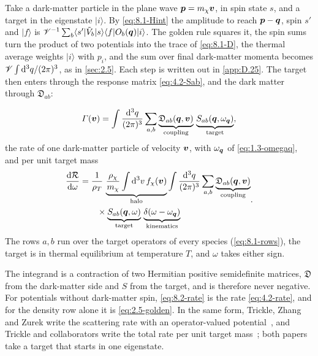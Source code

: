 Take a dark-matter particle in the plane wave $\bm{p} = m_{\chi}\bm{v}$, in spin state $s$, and a target in the eigenstate $|i\rangle$. By \cref{eq:8.1-Hint} the amplitude to reach $\bm{p} - \bm{q}$, spin $s'$ and $|f\rangle$ is $\mathscr{V}^{-1}\sum_b\langle s'|\tilde V_b|s\rangle\langle f|O_b(\bm{q})|i\rangle$. The golden rule squares it, the spin sums turn the product of two potentials into the trace of \cref{eq:8.1-D}, the thermal average weights $|i\rangle$ with $p_i$, and the sum over final dark-matter momenta becomes $\mathscr{V}\int\mathrm{d}^3q/(2\pi)^3$, as in \cref{sec:2.5}. Each step is written out in \cref{app:D.25}. The target then enters through the response matrix \cref{eq:4.2-Sab}, and the dark matter through $\mathfrak{D}_{ab}$:
\begin{keyresult}
\begin{equation}
  \varGamma(\bm{v}) = \int\frac{\mathrm{d}^3q}{(2\pi)^3}\sum_{a,b}\underbrace{\mathfrak{D}_{ab}(\bm{q},\bm{v})}_{\text{coupling}}\,\underbrace{S_{ab}(\bm{q},\omega_{\bm{q}})}_{\text{target}} ,
  \label{eq:8.2-rate}
\end{equation}
the rate of one dark-matter particle of velocity $\bm{v}$, with $\omega_{\bm{q}}$ of \cref{eq:1.3-omegaq}, and per unit target mass
\begin{equation}
  \begin{split}
  \frac{\mathrm{d}\mathcal{R}}{\mathrm{d}\omega} &= \frac{1}{\rho_T}\,\underbrace{\frac{\rho_\chi}{m_{\chi}}\int\mathrm{d}^3v\,f_\chi(\bm{v})}_{\text{halo}}\int\frac{\mathrm{d}^3q}{(2\pi)^3}\sum_{a,b}\underbrace{\mathfrak{D}_{ab}(\bm{q},\bm{v})}_{\text{coupling}} \\
  &\qquad\times\underbrace{S_{ab}(\bm{q},\omega)}_{\text{target}}\,\underbrace{\delta(\omega - \omega_{\bm{q}})}_{\text{kinematics}}
  \end{split} .
  \label{eq:8.2-spectrum}
\end{equation}
The rows $a, b$ run over the target operators of every species (\cref{eq:8.1-rows}), the target is in thermal equilibrium at temperature $T$, and $\omega$ takes either sign.
\end{keyresult}
\noindent The integrand is a contraction of two Hermitian positive semidefinite matrices, $\mathfrak{D}$ from the dark-matter side and $S$ from the target, and is therefore never negative. For potentials without dark-matter spin, \cref{eq:8.2-rate} is the rate \cref{eq:4.2-rate}, and for the density row alone it is \cref{eq:2.5-golden}. In the same form, Trickle, Zhang and Zurek write the scattering rate with an operator-valued potential~\cite[Eq.~(1)]{trickle2022effective}, and Trickle and collaborators write the total rate per unit target mass~\cite[Eqs.~(14)--(16)]{trickle2020multichannel}; both papers take a target that starts in one eigenstate.

